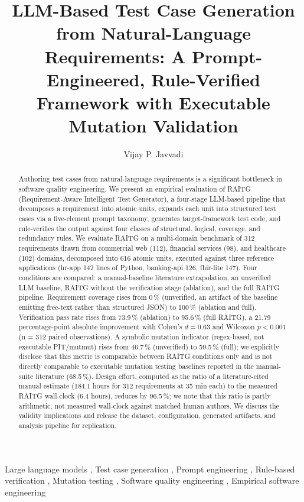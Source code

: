 \documentclass[review,12pt]{elsarticle}
\begin{document}
\begin{frontmatter}

\title{LLM-Based Test Case Generation from Natural-Language Requirements: A Prompt-Engineered, Rule-Verified Framework with Executable Mutation Validation}

\author{Vijay P. Javvadi}

\begin{abstract}
Authoring test cases from natural-language requirements is a
significant bottleneck in software quality engineering. We present an
empirical evaluation of RAITG (Requirement-Aware Intelligent Test
Generator), a four-stage LLM-based pipeline that decomposes a
requirement into atomic units, expands each unit into structured test
cases via a five-element prompt taxonomy, generates target-framework
test code, and rule-verifies the output against four classes of
structural, logical, coverage, and redundancy rules. We evaluate RAITG
on a multi-domain benchmark of 312 requirements drawn from commercial
web (112), financial services (98), and healthcare (102) domains,
decomposed into 616 atomic units, executed against three reference
applications (hr-app 142 lines of Python, banking-api 126, fhir-lite
147). Four conditions are compared: a manual-baseline literature
extrapolation, an unverified LLM baseline, RAITG without the
verification stage (ablation), and the full RAITG pipeline.
Requirement coverage rises from 0\,\% (unverified, an artifact of the
baseline emitting free-text rather than structured JSON) to 100\,\%
(ablation and full). Verification pass rate rises from 73.9\,\%
(ablation) to 95.6\,\% (full RAITG), a 21.79 percentage-point absolute
improvement with Cohen's $d = 0.63$ and Wilcoxon $p < 0.001$ (n = 312
paired observations). A symbolic mutation indicator (regex-based, not
executable PIT/mutmut) rises from 46.7\,\% (unverified) to 59.5\,\%
(full); we explicitly disclose that this metric is comparable between
RAITG conditions only and is not directly comparable to executable
mutation testing baselines reported in the manual-suite literature
(68.5\,\%). Design effort, computed as the ratio of a literature-cited
manual estimate (184.1 hours for 312 requirements at 35 min each) to
the measured RAITG wall-clock (6.4 hours), reduces by 96.5\,\%; we note
that this ratio is partly arithmetic, not measured wall-clock against
matched human authors. We discuss the validity implications and
release the dataset, configuration, generated artifacts, and analysis
pipeline for replication.
\end{abstract}

\begin{keyword}
Large language models \sep
Test case generation \sep
Prompt engineering \sep
Rule-based verification \sep
Mutation testing \sep
Software quality engineering \sep
Empirical software engineering
\end{keyword}

\end{frontmatter}
\end{document}
